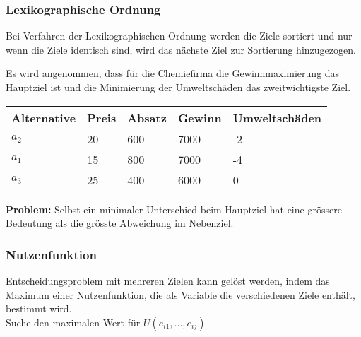 \subsubsection{Lexikographische Ordnung}
Bei Verfahren der Lexikographischen Ordnung werden die Ziele sortiert und nur wenn die Ziele identisch sind, wird das nächste Ziel zur Sortierung hinzugezogen.
\begin{example}
	Es wird angenommen, dass für die Chemiefirma die Gewinnmaximierung das Hauptziel ist und die Minimierung der Umweltschäden das zweitwichtigste Ziel. \\
	\begin{tabular}{|l|l|l|l|l|}
		\hline
		\textbf{Alternative} & \textbf{Preis} & \textbf{Absatz} & \textbf{Gewinn} & \textbf{Umweltschäden} \\ \hline
		$a_2$ & 20 & 600 & 7000 & -2 \\ \hline
		$a_1$ & 15 & 800 & 7000 & -4 \\ \hline		
		$a_3$ & 25 & 400 & 6000 & 0 \\ \hline
	\end{tabular}
\end{example}
\textbf{Problem:} Selbst ein minimaler Unterschied beim Hauptziel hat eine grössere Bedeutung als die grösste Abweichung im Nebenziel.

\subsubsection{Nutzenfunktion}
Entscheidungsproblem mit mehreren Zielen kann gelöst werden, indem das Maximum einer Nutzenfunktion, die als Variable die
verschiedenen Ziele enthält, bestimmt wird. \\
Suche den maximalen Wert für $U(e_{i1}, ..., e_{ij})$

